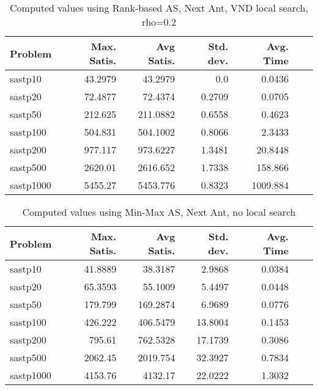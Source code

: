 \documentclass{article}
\begin{document}
\begin{table}[b!]
  \caption{Computed values using Rank-based AS, Next Ant, VND local search, rho=0.2}
  \label{tab:conf4}
  \setlength{\tabcolsep}{1.4mm}
  \centering
  \begin{tabular}{lrrrrrr}
    \bfseries Problem &
    \bfseries Max. Satis. &
    \bfseries Avg Satis. &
    \bfseries Std. dev. &
    \bfseries Avg. Time 
    \\\hline
    sastp10 & 43.2979 & 43.2979 & 0.0 & 0.0436 \\ 
    sastp20 & 72.4877 & 72.4374 & 0.2709 & 0.0705 \\ 
    sastp50 & 212.625 & 211.0882 & 0.6558 & 0.4623 \\ 
    sastp100 & 504.831 & 504.1002 & 0.8066 & 2.3433 \\ 
    sastp200 & 977.117 & 973.6227 & 1.3481 & 20.8448 \\ 
    sastp500 & 2620.01 & 2616.652 & 1.7338 & 158.866 \\ 
    sastp1000 & 5455.27 & 5453.776 & 0.8323 & 1009.884

    \\\hline
  \end{tabular}

\end{table}


\begin{table}[b!]
  \caption{Computed values using Min-Max AS, Next Ant, no local search}
  \label{tab:conf5}
  \setlength{\tabcolsep}{1.4mm}
  \centering
  \begin{tabular}{lrrrrrr}
    \bfseries Problem &
    \bfseries Max. Satis. &
    \bfseries Avg Satis. &
    \bfseries Std. dev. &
    \bfseries Avg. Time 
    \\\hline
   sastp10 & 41.8889 & 38.3187 & 2.9868 & 0.0384 \\ 
   sastp20 & 65.3593 & 55.1009 & 5.4497 & 0.0448 \\ 
   sastp50 & 179.799 & 169.2874 & 6.9689 & 0.0776 \\ 
   sastp100 & 426.222 & 406.5479 & 13.8004 & 0.1453 \\ 
   sastp200 & 795.61 & 762.5328 & 17.1739 & 0.3086 \\ 
   sastp500 & 2062.45 & 2019.754 & 32.3927 & 0.7834 \\ 
   sastp1000 & 4153.76 & 4132.17 & 22.0222 & 1.3032
    \\\hline
  \end{tabular}

\end{table}
\end{document}
